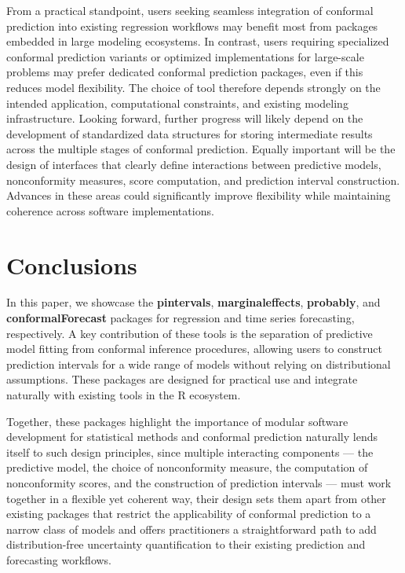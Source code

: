 From a practical standpoint, users seeking seamless integration of
conformal prediction into existing regression workflows may benefit most
from packages embedded in large modeling ecosystems. In contrast, users
requiring specialized conformal prediction variants or optimized
implementations for large-scale problems may prefer dedicated conformal
prediction packages, even if this reduces model flexibility. The choice
of tool therefore depends strongly on the intended application,
computational constraints, and existing modeling infrastructure. Looking
forward, further progress will likely depend on the development of
standardized data structures for storing intermediate results across the
multiple stages of conformal prediction. Equally important will be the
design of interfaces that clearly define interactions between predictive
models, nonconformity measures, score computation, and prediction
interval construction. Advances in these areas could significantly
improve flexibility while maintaining coherence across software
implementations.

\section{Conclusions}\label{conclusions}

In this paper, we showcase the \textbf{pintervals}, \textbf{marginaleffects},
\textbf{probably}, and \textbf{conformalForecast} packages for regression and time
series forecasting, respectively. A key contribution of these tools is
the separation of predictive model fitting from conformal inference
procedures, allowing users to construct prediction intervals for a wide
range of models without relying on distributional assumptions. These
packages are designed for practical use and integrate naturally with
existing tools in the R ecosystem.

Together, these packages highlight the importance of modular software
development for statistical methods and conformal prediction naturally
lends itself to such design principles, since multiple interacting
components --- the predictive model, the choice of nonconformity
measure, the computation of nonconformity scores, and the construction
of prediction intervals --- must work together in a flexible yet
coherent way, their design sets them apart from other existing packages
that restrict the applicability of conformal prediction to a narrow
class of models and offers practitioners a straightforward path to add
distribution-free uncertainty quantification to their existing
prediction and forecasting workflows.

